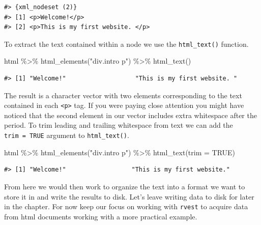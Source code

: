 \documentclass[
  letterpaper,
]{latex/krantz}
\newenvironment{Shaded}{\begin{snugshade}}{\end{snugshade}}
\newcommand{\AttributeTok}[1]{\textcolor[rgb]{0.40,0.45,0.13}{#1}}
\newcommand{\ConstantTok}[1]{\textcolor[rgb]{0.56,0.35,0.01}{#1}}
\newcommand{\FunctionTok}[1]{\textcolor[rgb]{0.28,0.35,0.67}{#1}}
\newcommand{\NormalTok}[1]{\textcolor[rgb]{0.00,0.23,0.31}{#1}}
\newcommand{\SpecialCharTok}[1]{\textcolor[rgb]{0.37,0.37,0.37}{#1}}
\newcommand{\StringTok}[1]{\textcolor[rgb]{0.13,0.47,0.30}{#1}}
\begin{document}
\begin{verbatim}
#> {xml_nodeset (2)}
#> [1] <p>Welcome!</p>
#> [2] <p>This is my first website. </p>
\end{verbatim}

To extract the text contained within a node we use the
\texttt{html\_text()} function.

\begin{Shaded}
\begin{Highlighting}[]
\NormalTok{html }\SpecialCharTok{\%\textgreater{}\%} 
  \FunctionTok{html\_elements}\NormalTok{(}\StringTok{"div.intro p"}\NormalTok{) }\SpecialCharTok{\%\textgreater{}\%} 
  \FunctionTok{html\_text}\NormalTok{()}
\end{Highlighting}
\end{Shaded}

\begin{verbatim}
#> [1] "Welcome!"                   "This is my first website. "
\end{verbatim}

The result is a character vector with two elements corresponding to the
text contained in each \texttt{\textless{}p\textgreater{}} tag. If you
were paying close attention you might have noticed that the second
element in our vector includes extra whitespace after the period. To
trim leading and trailing whitespace from text we can add the
\texttt{trim\ =\ TRUE} argument to \texttt{html\_text()}.

\begin{Shaded}
\begin{Highlighting}[]
\NormalTok{html }\SpecialCharTok{\%\textgreater{}\%} 
  \FunctionTok{html\_elements}\NormalTok{(}\StringTok{"div.intro p"}\NormalTok{) }\SpecialCharTok{\%\textgreater{}\%} 
  \FunctionTok{html\_text}\NormalTok{(}\AttributeTok{trim =} \ConstantTok{TRUE}\NormalTok{)}
\end{Highlighting}
\end{Shaded}

\begin{verbatim}
#> [1] "Welcome!"                  "This is my first website."
\end{verbatim}

From here we would then work to organize the text into a format we want
to store it in and write the results to disk. Let's leave writing data
to disk for later in the chapter. For now keep our focus on working with
\texttt{rvest} to acquire data from html documents working with a more
practical example.
\end{document}
